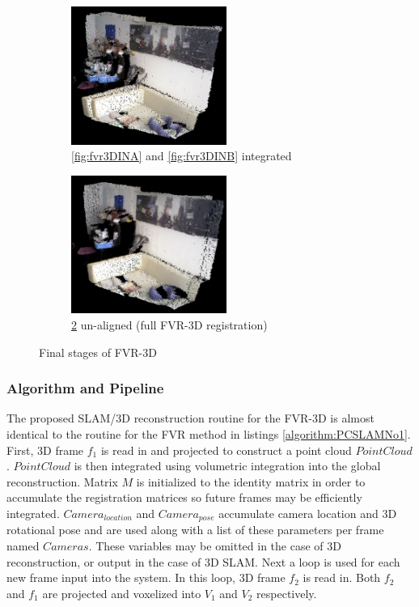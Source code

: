 \begin{figure}[!htb]
        \begin{subfigure}[b]{3.0in}
               \centering
                \includegraphics[width=2.0in]{images/methodology/FVR/fvr3d/noRegistration}
                \caption{\ref{fig:fvr3DINA} and \ref{fig:fvr3DINB} integrated}
                \label{fig:fvr3DPCAAB}
        \end{subfigure}%
        \begin{subfigure}[b]{3.0in}
               \centering
                \includegraphics[width=2.0in]{images/methodology/FVR/fvr3d/FVR3DReg}
                \caption{\ref{fig:fvr3DFVRPCAAB} un-aligned (full FVR-3D registration)}
                \label{fig:fvr3DFVRPCAAB}
        \end{subfigure}        
        
       \caption{Final stages of FVR-3D}
       \label{fig:FVR3D222}
\end{figure}



\subsubsection{Algorithm and Pipeline}

\label{METHOD_SECLL}

The proposed SLAM/3D reconstruction routine for the FVR-3D is almost identical to the routine for the FVR method in listings \ref{algorithm:PCSLAMNo1}. First, 3D frame $f_1$ is read in and projected to construct a point cloud $PointCloud$. $PointCloud$ is then integrated using volumetric integration into the global reconstruction. Matrix $M$ is initialized to the identity matrix in order to accumulate the registration matrices so future frames may be efficiently integrated. $Camera_{location}$ and $Camera_{pose}$ accumulate camera location and 3D rotational pose and are used along with a list of these parameters per frame named $Cameras$. These variables may be omitted in the case of 3D reconstruction, or output in the case of 3D SLAM. Next a loop is used for each new frame input into the system. In this loop, 3D frame $f_2$ is read in. Both $f_2$ and $f_1$ are projected and voxelized into $V_1$ and $V_2$ respectively. \\

